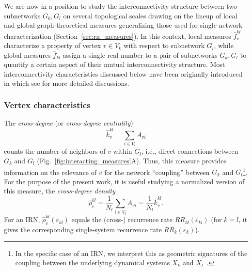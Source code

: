 		We are now in a position to study the interconnectivity structure between two subnetworks $G_k, G_l$ on several topological scales drawing on the lineup of local and global graph-theoretical measures generalizing those used for single network characterization (Section~\ref{sec:rn_measures}). In this context, local measures $\hat{f}_v^{kl}$ characterize a property of vertex $v \in V_k$ with respect to subnetwork $G_l$, while global measures $\hat{f}_{kl}$ assign a single real number to a pair of subnetworks $G_k, G_l$ to quantify a certain aspect of their mutual interconnectivity structure. Most interconnectivity characteristics discussed below have been originally introduced in \cite{Donges2011b} which see for more detailed discussions.

		\subsubsection{Vertex characteristics}
		The \textit{cross-degree} (or \textit{cross-degree centrality})
\begin{equation}
\hat{k}_v^{kl} = \sum_{i \in V_l} A_{vi}
\label{eq:degree_cross}
\end{equation}
counts the number of neighbors of $v$ within $G_l$, i.e., direct connections between $G_k$ and $G_l$ (Fig.~\ref{fig:interacting_measures}A). Thus, this measure provides information on the relevance of $v$ for the network ``coupling'' between $G_k$ and $G_l$\footnote{In the specific case of an IRN, we interpret this as geometric signatures of the coupling between the underlying dynamical systems $X_k$ and $X_l$~\cite{Feldhoff2011,Feldhoff2012}.}. For the purpose of the present work, it is useful studying a normalized version of this measure, the \textit{cross-degree density}
\begin{equation}
\hat{\rho}_v^{kl} = \frac{1}{N_l} \sum_{i \in V_l} A_{vi} = \frac{1}{N_l} \hat{k}_v^{kl}.
\label{eq:locrho_cross}
\end{equation}
\noindent
For an IRN, $\hat{\rho}_v^{kl}(\varepsilon_{kl})$ equals the (cross-) recurrence rate $RR_{kl}(\varepsilon_{kl})$ (for $k=l$, it gives the corresponding single-system recurrence rate $RR_k(\varepsilon_k)$).

